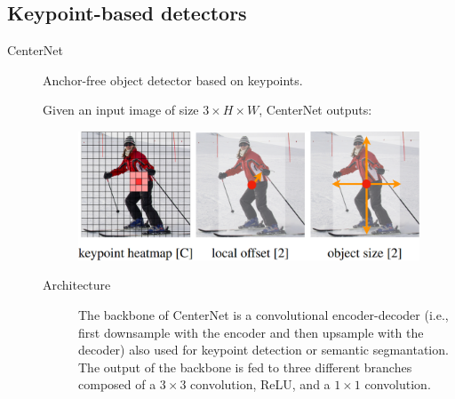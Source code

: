 \subsection{Keypoint-based detectors}

\begin{description}
    \item[CenterNet] 
        Anchor-free object detector based on keypoints.

        Given an input image of size $3 \times H \times W$, CenterNet outputs:

        \begin{figure}[H]
            \centering
            \includegraphics[width=0.5\linewidth]{./img/centernet_outputs.png}
        \end{figure}

        \begin{description}
            \item[Architecture] 
                The backbone of CenterNet is a convolutional encoder-decoder (i.e., first downsample with the encoder and then upsample with the decoder) also used for keypoint detection or semantic segmantation. The output of the backbone is fed to three different branches composed of a $3 \times 3$ convolution, ReLU, and a $1 \times 1$ convolution.


\end{description}
\end{description}
